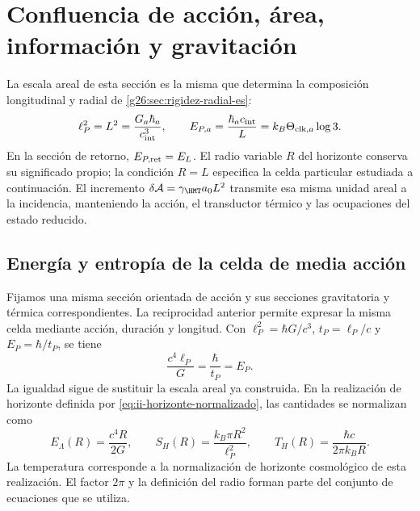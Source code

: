 \section{Confluencia de acción, área, información y gravitación}
\label{sec:confluencia}

La escala areal de esta sección es la misma que determina la
composición longitudinal y radial de \ref{g26:sec:rigidez-radial-es}:
\begin{equation}
 \ell_P^2=L^2=\frac{G_a\hbar_a}{c_{\rm int}^3},\qquad
 E_{P,a}=\frac{\hbar_a c_{\rm int}}{L}
        =k_B\Theta_{{\rm clk},a}\log3.
 \label{eq:ii-g26-longitud-energia-area}
\end{equation}
En la sección de retorno, \(E_{P,\rm ret}=E_L\). El radio variable
\(R\) del horizonte conserva su significado propio; la condición
\(R=L\) especifica la celda particular estudiada a continuación.
El incremento \(\delta\mathcal A=\gamma_{\HMT}a_0L^2\) transmite
esa misma unidad areal a la incidencia, manteniendo la acción, el
transductor térmico y las ocupaciones del estado reducido.

\subsection{Energía y entropía de la celda de media acción}

Fijamos una misma sección orientada de acción y sus secciones
gravitatoria y térmica correspondientes. La reciprocidad anterior permite expresar la misma celda mediante
acción, duración y longitud. Con
\(\ell_P^2=\hbar G/c^3\), \(t_P=\ell_P/c\) y
\(E_P=\hbar/t_P\), se tiene
\[
 \frac{c^4\ell_P}{G}=\frac{\hbar}{t_P}=E_P.
\]
La igualdad sigue de sustituir la escala areal ya construida. En la
realización de horizonte definida por \eqref{eq:ii-horizonte-normalizado}, las cantidades
se normalizan como
\begin{equation}
 E_\Lambda(R)=\frac{c^4R}{2G},\qquad
 S_H(R)=\frac{k_B\pi R^2}{\ell_P^2},\qquad
 T_H(R)=\frac{\hbar c}{2\pi k_BR}.
 \label{eq:ii-horizonte-normalizado}
\end{equation}
La temperatura corresponde a la normalización de horizonte cosmológico
de esta realización. El factor \(2\pi\) y la definición del radio
forman parte del conjunto de ecuaciones que se utiliza.

